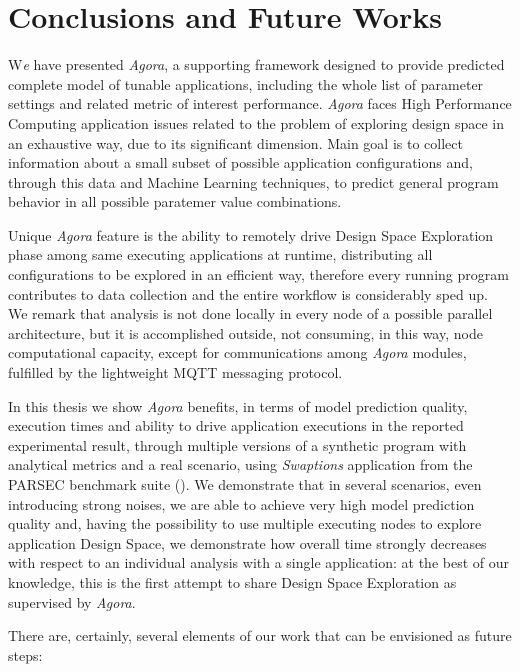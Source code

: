 \chapter{Conclusions and Future Works}\label{end}

\lettrine{W}{}\textit{e} have presented \textit{Agora}, a supporting framework designed to provide predicted complete model of tunable applications, including the whole list of parameter settings and related metric of interest performance. \textit{Agora} faces High Performance Computing application issues related to the problem of exploring design space in an exhaustive way, due to its significant dimension. Main goal is to collect information about a small subset of possible application configurations and, through this data and Machine Learning techniques, to predict general program behavior in all possible paratemer value combinations.

Unique \textit{Agora} feature is the ability to remotely drive Design Space Exploration phase among same executing applications at runtime, distributing all configurations to be explored in an efficient way, therefore every running program contributes to data collection and the entire workflow is considerably sped up. We remark that analysis is not done locally in every node of a possible parallel architecture, but it is accomplished outside, not consuming, in this way, node computational capacity, except for communications among \textit{Agora} modules, fulfilled by the lightweight MQTT messaging protocol.

In this thesis we show \textit{Agora} benefits, in terms of model prediction quality, execution times and ability to drive application executions in the reported experimental result, through multiple versions of a synthetic program with analytical metrics and a real scenario, using \textit{Swaptions} application from the PARSEC benchmark suite (\cite{bienia2008parsec}). We demonstrate that in several scenarios, even introducing strong noises, we are able to achieve very high model prediction quality and, having the possibility to use multiple executing nodes to explore application Design Space, we demonstrate how overall time strongly decreases with respect to an individual analysis with a single application: at the best of our knowledge, this is the first attempt to share Design Space Exploration as supervised by \textit{Agora}.

There are, certainly, several elements of our work that can be envisioned as future steps:

